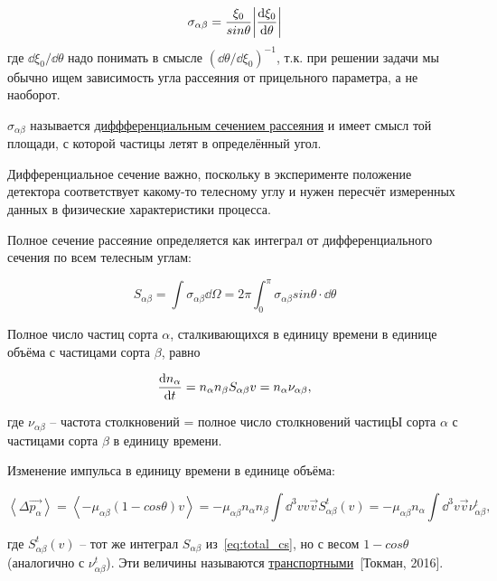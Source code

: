 \documentclass[10pt, a4paper]{article}
\newcommand{\Tokman}{~[Токман, 2016]}
\begin{document}
\begin{equation} \label{eq:transport_cs}
	\sigma_{\alpha\beta} = \frac{\xi_0}{sin\theta}\abs{\dv{\xi_0}{\theta}}
\end{equation}
где $\dd\xi_0/\dd\theta$ надо понимать в смысле $(\dd\theta/\dd\xi_0)^{-1}$, т.к. при решении задачи мы обычно ищем зависимость угла рассеяния от прицельного параметра, а не наоборот.

$\sigma_{\alpha\beta}$ называется \uline{диффференциальным сечением рассеяния} и имеет смысл той площади, с которой частицы летят в определённый угол.

Дифференциальное сечение важно, поскольку в эксперименте положение детектора соответствует какому-то телесному углу и нужен пересчёт измеренных данных в физические характеристики процесса.

Полное сечение рассеяние определяется как интеграл от дифференциального сечения по всем телесным углам:

\begin{equation} \label{eq:total_cs}
	S_{\alpha\beta} = \int \sigma_{\alpha\beta} \dd\Omega = 2 \pi \int_{0}^{\pi} \sigma_{\alpha\beta} sin\theta \cdot \dd\theta
\end{equation}

Полное число частиц сорта $\alpha$, сталкивающихся в единицу времени в единице объёма с частицами сорта $\beta$, равно

\begin{equation*}
	\dv{n_\alpha}{t} = n_\alpha n_\beta S_{\alpha\beta} v = n_\alpha\nu_{\alpha\beta},
\end{equation*}

где $\nu_{\alpha\beta}$ -- частота столкновений = полное число столкновений частицЫ сорта $\alpha$ с частицами сорта $\beta$ в единицу времени.

Изменение импульса в единицу времени в единице объёма:

\begin{equation*}
	\left\langle \Delta \vec{p_\alpha}\right\rangle = \left\langle -\mu_{\alpha\beta}(1-cos\theta)v \right\rangle = -\mu_{\alpha\beta}n_\alpha n_\beta \int \dd^3v v \vec{v} S_{\alpha\beta}^t(v) = -\mu_{\alpha\beta}n_\alpha\int \dd^3v \vec{v}\nu_{\alpha\beta}^t,
\end{equation*}

где $S_{\alpha\beta}^t(v)$ -- тот же интеграл $S_{\alpha\beta}$ из~\eqref{eq:total_cs}, но с весом $1-cos\theta$ (аналогично с $\nu_{\alpha\beta}^t$). Эти величины называются \uline{транспортными}\Tokman.
\end{document}
